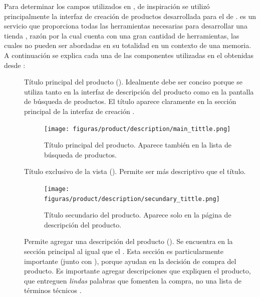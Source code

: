 		Para determinar los campos utilizados en , de inspiración se utilizó principalmente la interfaz de creación de productos desarrollada para el \websiteINT de \shopifyNAME {}. \shopifyNAME es un servicio que proporciona todas las herramientas necesarias para desarrollar una tienda \online, razón por la cual cuenta con una gran cantidad de herramientas, las cuales no pueden ser abordadas en su totalidad en un contexto de una memoria. A continuación se explica cada una de las componentes utilizadas en el \frameworkPC obtenidas desde  \websiteINT \shopifyNAME:

		\begin{description}
			\item [\titleForm]
				Título principal del producto (). Idealmente debe ser conciso porque se utiliza tanto en la interfaz de descripción del producto como en la pantalla de búsqueda de productos. El título aparece claramente en la sección principal de la interfaz de creación .

				\begin{figure}[H]
					\centering
					\texttt{[image: figuras/product/description/main\_tittle.png]}

					\caption{Título principal del producto. Aparece también en la lista de búsqueda de productos.}
					\label{figure:product:description:main_tittle}
				\end{figure}

			\item [\pageTitleForm]
				Título exclusivo de la vista  (). Permite ser más descriptivo que el título. 

				\begin{figure}[H]
					\centering
					\texttt{[image: figuras/product/description/secundary\_tittle.png]}

					\caption{Título secundario del producto. Aparece solo en la página de descripción del producto.}
					\label{figure:product:description:secundary_tittle}
				\end{figure}

			\item [\descriptionForm]
				Permite agregar una descripción del producto (). Se encuentra en la sección principal al igual que el \titleForm {}. Esta sección es particularmente importante (junto con \multimediaForm), porque ayudan en la decisión de compra del producto. Es importante agregar descripciones que expliquen el producto, que entreguen \textit{lindas} palabras que fomenten la compra, no una lista de términos técnicos \cite{online_cxpartners_official_people_see_to_buy}.


\end{description}
